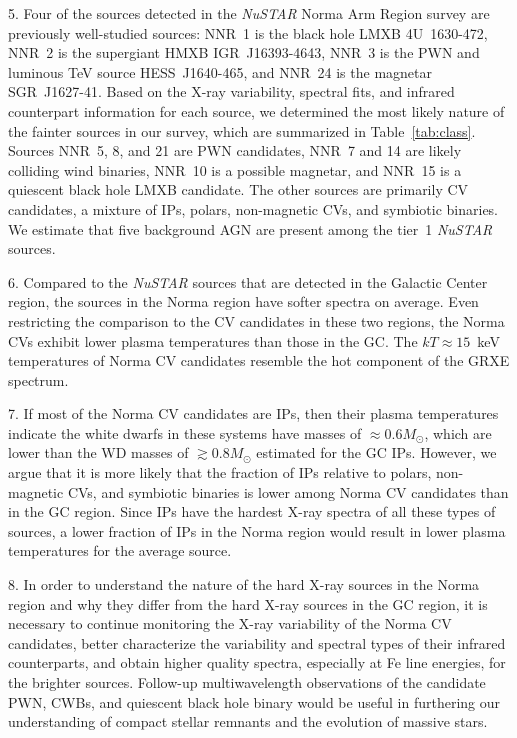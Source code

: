 \documentclass[iop,revtex4]{emulateapj}
\begin{document}
\begin{list}{}{%
\setlength{\topsep}{0pt}%
\setlength{\leftmargin}{0.0in}%
\setlength{\listparindent}{0.0in}%
\setlength{\itemindent}{0.1in}%
\setlength{\parsep}{\parskip}%
\setlength{\itemsep}{4pt}
}
\item[]
5. Four of the sources detected in the \textit{NuSTAR} Norma Arm Region survey are previously well-studied sources: NNR~1 is the black hole LMXB 4U~1630-472, NNR~2 is the supergiant HMXB IGR~J16393-4643, NNR~3 is the PWN and luminous TeV source HESS~J1640-465, and NNR~24 is the magnetar SGR~J1627-41.  Based on the X-ray variability, spectral fits, and infrared counterpart information for each source, we determined the most likely nature of the fainter sources in our survey, which are summarized in Table~\ref{tab:class}.  Sources NNR~5, 8, and 21 are PWN candidates, NNR~7 and 14 are likely colliding wind binaries, NNR~10 is a possible magnetar, and NNR~15 is a quiescent black hole LMXB candidate.  The other sources are primarily CV candidates, a mixture of IPs, polars, non-magnetic CVs, and symbiotic binaries.  We estimate that five background AGN are present among the tier~1 \textit{NuSTAR} sources.  
\item[]
6.  Compared to the \textit{NuSTAR} sources that are detected in the Galactic Center region, the sources in the Norma region have softer spectra on average.  Even restricting the comparison to the CV candidates in these two regions, the Norma CVs exhibit lower plasma temperatures than those in the GC.  The $kT\approx15$~keV temperatures of Norma CV candidates resemble the hot component of the GRXE spectrum.  
\item[]
7.  If most of the Norma CV candidates are IPs, then their plasma temperatures indicate the white dwarfs in these systems have masses of $\approx0.6M_{\odot}$, which are lower than the WD masses of $\gtrsim0.8M_{\odot}$ estimated for the GC IPs.  However, we argue that it is more likely that the fraction of IPs relative to polars, non-magnetic CVs, and symbiotic binaries is lower among Norma CV candidates than in the GC region.  Since IPs have the hardest X-ray spectra of all these types of sources, a lower fraction of IPs in the Norma region would result in lower plasma temperatures for the average source. 
\item[]
8.  In order to understand the nature of the hard X-ray sources in the Norma region and why they differ from the hard X-ray sources in the GC region, it is necessary to continue monitoring the X-ray variability of the Norma CV candidates, better characterize the variability and spectral types of their infrared counterparts, and obtain higher quality spectra, especially at Fe line energies, for the brighter sources.  Follow-up multiwavelength observations of the candidate PWN, CWBs, and quiescent black hole binary would be useful in furthering our understanding of compact stellar remnants and the evolution of massive stars.
\end{list}
\end{document}
